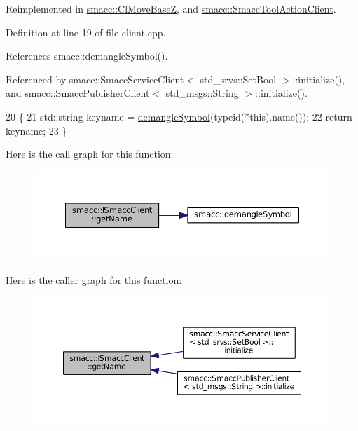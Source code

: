 Reimplemented in \hyperlink{classsmacc_1_1ClMoveBaseZ_aa0292ad4bf6ddd4591d239c71ae0d06a}{smacc\+::\+Cl\+Move\+BaseZ}, and \hyperlink{classsmacc_1_1SmaccToolActionClient_a07ee35b66e8e8e28c9e39052835515c9}{smacc\+::\+Smacc\+Tool\+Action\+Client}.



Definition at line 19 of file client.\+cpp.



References smacc\+::demangle\+Symbol().



Referenced by smacc\+::\+Smacc\+Service\+Client$<$ std\+\_\+srvs\+::\+Set\+Bool $>$\+::initialize(), and smacc\+::\+Smacc\+Publisher\+Client$<$ std\+\_\+msgs\+::\+String $>$\+::initialize().


\begin{DoxyCode}
20 \{
21     std::string keyname = \hyperlink{namespacesmacc_a458f5e70d468824fbcd66cc7729deaa8}{demangleSymbol}(\textcolor{keyword}{typeid}(*this).name());
22     \textcolor{keywordflow}{return} keyname;
23 \}
\end{DoxyCode}


Here is the call graph for this function\+:
\nopagebreak
\begin{figure}[H]
\begin{center}
\leavevmode
\includegraphics[width=350pt]{classsmacc_1_1ISmaccClient_a20846aabfd1de832aa27d7a8237a1742_cgraph}
\end{center}
\end{figure}




Here is the caller graph for this function\+:
\nopagebreak
\begin{figure}[H]
\begin{center}
\leavevmode
\includegraphics[width=350pt]{classsmacc_1_1ISmaccClient_a20846aabfd1de832aa27d7a8237a1742_icgraph}
\end{center}
\end{figure}


